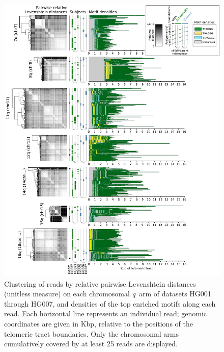 \documentclass{article}
\begin{document}
                \begin{figure}[h!] \centering %
                \includegraphics[height=.88\textheight,width=\textwidth,keepaspectratio]{../figures/Figure_5.pdf} %
                \caption{ %
                    \small Clustering of reads by relative pairwise Levenshtein distances (unitless measure) %
                    on each chromosomal \mbox{\textit{q} arm} of datasets HG001 through HG007, %
                    and densities of the top enriched motifs along each read. %
                    Each horizontal line represents an individual read; %
                    genomic coordinates are given in Kbp, relative to the positions of the telomeric tract boundaries. %
                    Only the chromosomal arms cumulatively covered by at least 25 reads are displayed. %
                } %
                \label{fig:haplotypes_q} %
                \end{figure} %
\end{document}
